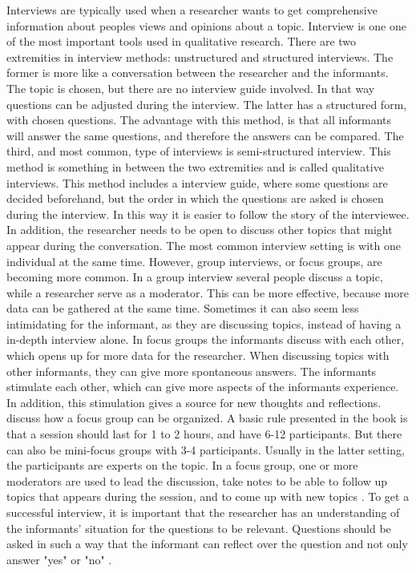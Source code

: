 Interviews are typically used when a researcher wants to get comprehensive information about peoples views and opinions about a topic. Interview is one one of the most important tools used in qualitative research. There are two extremities in interview methods: unstructured and structured interviews. The former is more like a conversation between the researcher and the informants. The topic is chosen, but there are no interview guide involved. In that way questions can be adjusted during the interview. The latter has a structured form, with chosen questions. The advantage with this method, is that all informants will answer the same questions, and therefore the answers can be compared. The third, and most common, type of interviews is semi-structured interview. This method is something in between the two extremities and is called qualitative interviews. This method includes a interview guide, where some questions are decided beforehand, but the order in which the questions are asked is chosen during the interview. In this way it is easier to follow the story of the interviewee. In addition, the researcher needs to be open to discuss other topics that might appear during the conversation. The most common interview setting is with one individual at the same time. However, group interviews, or focus groups, are becoming more common. In a group interview several people discuss a topic, while a researcher serve as a moderator. This can be more effective, because more data can be gathered at the same time. Sometimes it can also seem less intimidating for the informant, as they are discussing topics, instead of having a in-depth interview alone. In focus groups the informants discuss with each other, which opens up for more data for the researcher. When discussing topics with other informants, they can give more spontaneous answers. The informants stimulate each other, which can give more aspects of the informants experience. In addition, this stimulation gives a source for new thoughts and reflections. \cite{tjora} discuss how a focus group can be organized.  A basic rule presented in the book is that a session should last for 1 to 2 hours, and have 6-12 participants. But there can also be mini-focus groups with 3-4 participants. Usually in the latter setting, the participants are experts on the topic. In a focus group, one or more moderators are used to lead the discussion, take notes to be able to follow up topics that appears during the session, and to come up with new topics \cite{tjora}. To get a successful interview, it is important that the researcher has an understanding of the informants’ situation for the questions to be relevant. Questions should be asked in such a way that the informant can reflect over the question and not only answer "yes" or "no" \cite{qualitative}.

